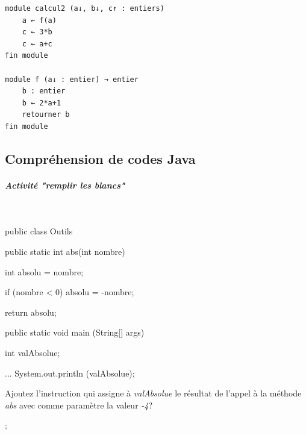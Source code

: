 \documentclass[11pt,a4paper]{article}
\begin{document}
\begin{itemize}
\begin{verbatim}
module calcul2 (a↓, b↓, c↑ : entiers)
    a ← f(a) 
    c ← 3*b 
    c ← a+c
fin module

module f (a↓ : entier) → entier
    b : entier
    b ← 2*a+1
    retourner b
fin module
				            \end{verbatim} \textcolor{gray}{\underline{\hspace*{1em}}}  \textcolor{gray}{\underline{\hspace*{1em}}}  \textcolor{gray}{\underline{\hspace*{1em}}}  \textcolor{gray}{\underline{\hspace*{2em}}} 
					\end{itemize}
				
            \par
        \subsection{Compr\'ehension de codes Java}
			
		\subparagraph{Activit\'e "remplir les blancs"} 
		
                \textcolor{white}{.} \par
            \begin{Java}
public class Outils {

	public static int abs(int nombre) { 

		int absolu = nombre;

		if (nombre < 0) {		
			absolu = -nombre;
		} 
		
		return absolu;
		
	}
	
	public static void main (String[] args) {  
	
		int valAbsolue;  
		
		...  
		System.out.println (valAbsolue);  
		
	}

}				\end{Java}
                Ajoutez l'instruction qui assigne \`a \textit{valAbsolue} 
                le r\'esultat de l'appel \`a la m\'ethode \textit{abs} avec comme param\`etre la valeur 
                \textit{-4}?
              
            \par
         \textcolor{gray}{\underline{\hspace*{10em}}}  \textcolor{gray}{\underline{\hspace*{1em}}}  \textcolor{gray}{\underline{\hspace*{5em}}}  ;
            \clearpage
			
\end{document}

